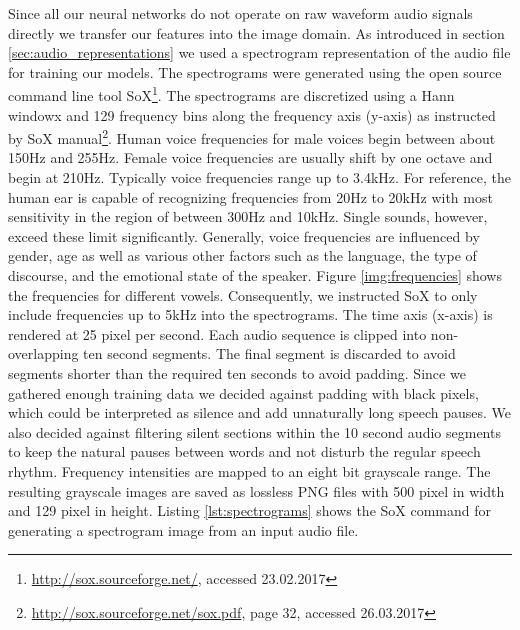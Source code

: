 	Since all our neural networks do not operate on raw waveform audio signals directly we transfer our features into the image domain. As introduced in section \ref{sec:audio_representations} we used a spectrogram representation of the audio file for training our models. The spectrograms were generated using the open source command line tool SoX\footnote{\url{http://sox.sourceforge.net/}, accessed 23.02.2017}. The spectrograms are discretized using a Hann window\cite{blackman1958measurement}x and 129 frequency bins along the frequency axis (y-axis) as instructed by SoX manual\footnote{\url{http://sox.sourceforge.net/sox.pdf}, page 32, accessed 26.03.2017}. Human voice frequencies for male voices begin between about 150Hz and 255Hz\cite{traunmuller1993frequency}. Female voice frequencies are usually shift by one octave and begin at 210Hz. Typically voice frequencies range up to 3.4kHz. For reference, the human ear is capable of recognizing frequencies from 20Hz to 20kHz with most sensitivity in the region of between 300Hz and 10kHz. Single sounds, however, exceed these limit significantly. Generally, voice frequencies are influenced by gender, age as well as various other factors such as the language, the type of discourse, and the emotional state of the speaker. Figure \ref{img:frequencies} shows the frequencies for different vowels. Consequently, we instructed SoX to only include frequencies up to 5kHz into the spectrograms. The time axis (x-axis) is rendered at 25 pixel per second. Each audio sequence is clipped into non-overlapping ten second segments. The final segment is discarded to avoid segments shorter than the required ten seconds to avoid padding. Since we gathered enough training data we decided against padding with black pixels, which could be interpreted as silence and add unnaturally long speech pauses. We also decided against filtering silent sections within the 10 second audio segments to keep the natural pauses between words and not disturb the regular speech rhythm. Frequency intensities are mapped to an eight bit grayscale range. The resulting grayscale images are saved as lossless PNG files with 500 pixel in width and 129 pixel in height. Listing \ref{lst:spectrograms} shows the SoX command for generating a spectrogram image from an input audio file.
	
